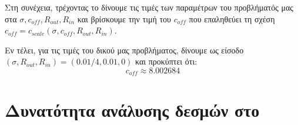 Στη συνέχεια, τρέχοντας το   δίνουμε τις τιμές των παραμέτρων του προβλήματός μας στα $\sigma, c_{off}, R_{out}, R_{in}$ και βρίσκουμε την τιμή του $c_{off}$ που επαληθεύει τη σχέση $c_{off} = c_{scale} \left(\sigma, c_{off}, R_{out}, R_{in} \right)$.




Εν τέλει, για τις τιμές του δικού μας προβλήματος, δίνουμε ως είσοδο $\left(\sigma, R_{out}, R_{in} \right) = \left(0.01/4,0.01, 0 \right)$ και προκύπτει ότι:
\begin{equation}
c_{off} \approx 8.002684
\end{equation}

\section{Δυνατότητα ανάλυσης δεσμών στο }


